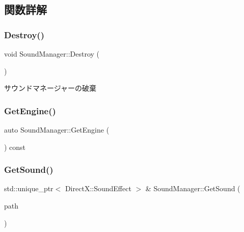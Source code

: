 \subsection{関数詳解}
\mbox{\label{class_sound_manager_abf0d473d0a31323c8e74684976b08e7f}} 
\subsubsection{\texorpdfstring{Destroy()}{Destroy()}}
{\footnotesize\ttfamily void Sound\+Manager\+::\+Destroy (\begin{DoxyParamCaption}{ }\end{DoxyParamCaption})}



サウンドマネージャーの破棄 

\mbox{\label{class_sound_manager_a5a575ac572eb0b50b3bb48b879a1a7e6}} 
\subsubsection{\texorpdfstring{Get\+Engine()}{GetEngine()}}
{\footnotesize\ttfamily auto Sound\+Manager\+::\+Get\+Engine (\begin{DoxyParamCaption}{ }\end{DoxyParamCaption}) const\hspace{0.3cm}{\ttfamily [inline]}}

\mbox{\label{class_sound_manager_a3ba4b2fe49cdc051f33aa800851f8b98}} 
\subsubsection{\texorpdfstring{Get\+Sound()}{GetSound()}}
{\footnotesize\ttfamily std\+::unique\+\_\+ptr$<$ Direct\+X\+::\+Sound\+Effect $>$ \& Sound\+Manager\+::\+Get\+Sound (\begin{DoxyParamCaption}\item[{W\+C\+H\+AR $\ast$}]{path }\end{DoxyParamCaption})}



